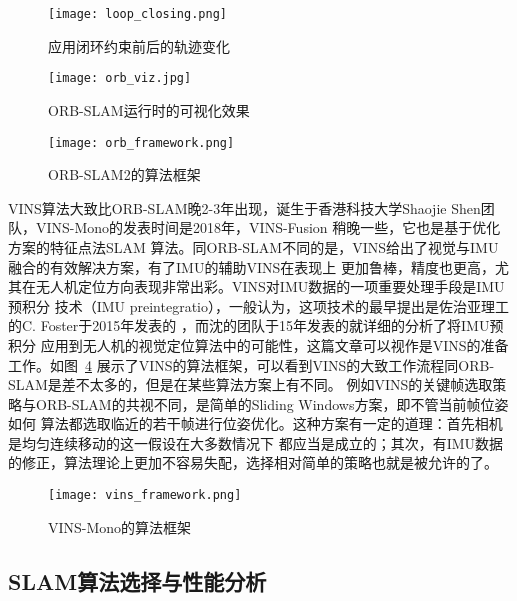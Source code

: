 \begin{figure}[ht] %
  \centering
  \texttt{[image: loop\_closing.png]}
  \caption{应用闭环约束前后的轨迹变化}
  \label{fig:loop_closing}
\end{figure}


\begin{figure}[ht] %
  \centering
  \texttt{[image: orb\_viz.jpg]}
  \caption{ORB-SLAM运行时的可视化效果}
  \label{fig:orb_viz}
\end{figure}

\begin{figure}[ht] %
  \centering
  \texttt{[image: orb\_framework.png]}
  \caption{ORB-SLAM2的算法框架}
  \label{fig:orb_frame}
\end{figure}




VINS\cite{qin2018vins}算法大致比ORB-SLAM晚2-3年出现，诞生于香港科技大学Shaojie Shen团队，VINS-Mono的发表时间是2018年，VINS-Fusion
稍晚一些，它也是基于优化方案的特征点法SLAM
算法。同ORB-SLAM不同的是，VINS给出了视觉与IMU融合的有效解决方案，有了IMU的辅助VINS在表现上
更加鲁棒，精度也更高，尤其在无人机定位方向表现非常出彩。VINS对IMU数据的一项重要处理手段是IMU预积分
技术（IMU preintegratio），一般认为，这项技术的最早提出是佐治亚理工的C. Foster于2015年发表的
\cite{forster2015imu}，而沈的团队于15年发表的\cite{shen2015tightly}就详细的分析了将IMU预积分
应用到无人机的视觉定位算法中的可能性，这篇文章可以视作是VINS的准备工作。如图~\ref{fig:vins_frame}
展示了VINS的算法框架，可以看到VINS的大致工作流程同ORB-SLAM是差不太多的，但是在某些算法方案上有不同。
例如VINS的关键帧选取策略与ORB-SLAM的共视不同，是简单的Sliding Windows方案，即不管当前帧位姿如何
算法都选取临近的若干帧进行位姿优化。这种方案有一定的道理：首先相机是均匀连续移动的这一假设在大多数情况下
都应当是成立的；其次，有IMU数据的修正，算法理论上更加不容易失配，选择相对简单的策略也就是被允许的了。


\begin{figure}[ht] %
  \centering
  \texttt{[image: vins\_framework.png]}
  \caption{VINS-Mono的算法框架}
  \label{fig:vins_frame}
\end{figure}

\subsection{SLAM算法选择与性能分析}


